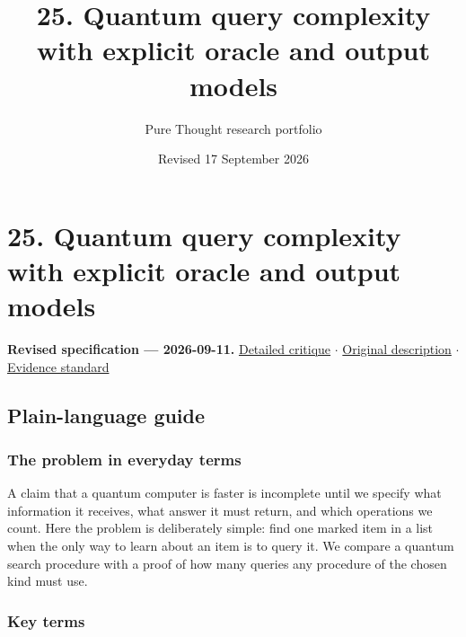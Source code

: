 \documentclass[
  11pt,
]{article}
\title{25. Quantum query complexity with explicit oracle and output
models}
\author{Pure Thought research portfolio}
\date{Revised 17 September 2026}
\begin{document}
\maketitle
\thispagestyle{empty}
\clearpage

\section{25. Quantum query complexity with explicit oracle and output
models}

\textbf{Revised specification --- 2026-09-11.}
\href{https://github.com/rick-stevens-ai/Pure-Thought/blob/main/reviews/25-Quantum-Algorithms-Complexity.md}{Detailed
critique} \ensuremath{\cdot}
\href{https://github.com/rick-stevens-ai/Pure-Thought/blob/main/archive/original-PRDs/25-Quantum-Algorithms-Complexity.md}{Original
description} \ensuremath{\cdot}
\href{https://github.com/rick-stevens-ai/Pure-Thought/blob/main/reviews/EVIDENCE-STANDARD.md}{Evidence
standard}

\subsection{Plain-language guide}

\subsubsection{The problem in everyday terms}

A claim that a quantum computer is faster is incomplete until we specify
what information it receives, what answer it must return, and which
operations we count. Here the problem is deliberately simple: find one
marked item in a list when the only way to learn about an item is to
query it. We compare a quantum search procedure with a proof of how many
queries any procedure of the chosen kind must use.

\subsubsection{Key terms}
\end{document}
